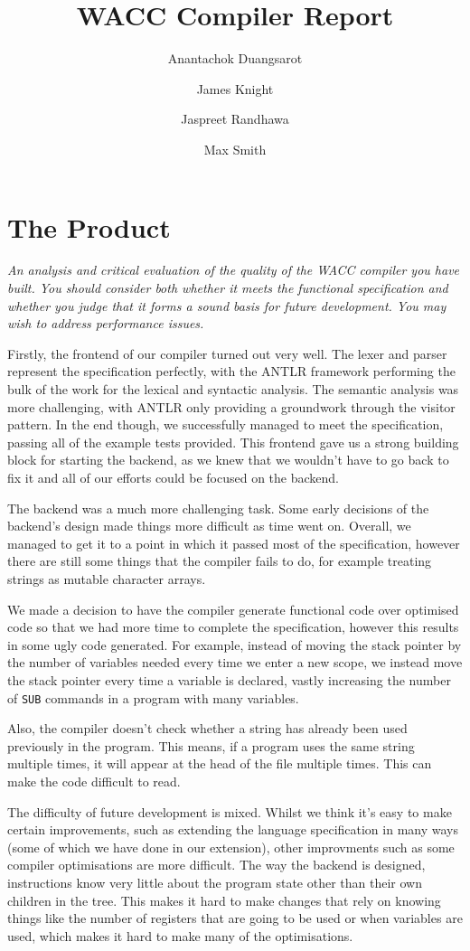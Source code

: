 \documentclass[]{article}
\date{\displaydate{date}}
\title{WACC Compiler Report}
\author{
	Anantachok Duangsarot \\
	\and
	James Knight \\
	\and
	Jaspreet Randhawa \\
	\and
	Max Smith \\
}
\newcommand{\spec}[1]{\textit{#1}\par\noindent}
\begin{document}
\maketitle

\section{The Product}
\spec{An analysis and critical evaluation of the quality of the WACC compiler you have built. You should consider both whether it meets the functional specification and whether you judge that it forms a sound basis for future development. You may wish to address performance issues.}
Firstly, the frontend of our compiler turned out very well. The lexer and parser represent the specification perfectly, with the ANTLR framework performing the bulk of the work for the lexical and syntactic analysis. The semantic analysis was more challenging, with ANTLR only providing a groundwork through the visitor pattern. In the end though, we successfully managed to meet the specification, passing all of the example tests provided. This frontend gave us a strong building block for starting the backend, as we knew that we wouldn't have to go back to fix it and all of our efforts could be focused on the backend.

The backend was a much more challenging task. Some early decisions of the backend's design made things more difficult as time went on. Overall, we managed to get it to a point in which it passed most of the specification, however there are still some things that the compiler fails to do, for example treating strings as mutable character arrays.

We made a decision to have the compiler generate functional code over optimised code so that we had more time to complete the specification, however this results in some ugly code generated. For example, instead of moving the stack pointer by the number of variables needed every time we enter a new scope, we instead move the stack pointer every time a variable is declared, vastly increasing the number of {\tt SUB} commands in a program with many variables.

Also, the compiler doesn't check whether a string has already been used previously in the program. This means, if a program uses the same string multiple times, it will appear at the head of the file multiple times. This can make the code difficult to read.

The difficulty of future development is mixed. Whilst we think it's easy to make certain improvements, such as extending the language specification in many ways (some of which we have done in our extension), other improvments such as some compiler optimisations are more difficult. The way the backend is designed, instructions know very little about the program state other than their own children in the tree. This makes it hard to make changes that rely on knowing things like the number of registers that are going to be used or when variables are used, which makes it hard to make many of the optimisations.
\end{document}
